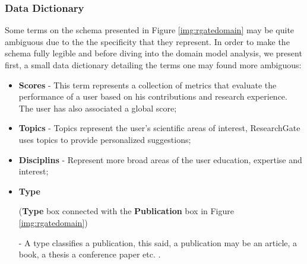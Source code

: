 \subsubsection*{Data Dictionary}
Some terms on the schema presented in Figure \ref{img:rgatedomain} may be quite ambiguous due to the the specificity that they represent. In order to make the schema fully legible and before diving into the domain model analysis, we present first, a small data dictionary detailing the terms one may found more ambiguous:

\begin{itemize}
\item \textbf{Scores} - This term represents a collection of metrics that evaluate the performance of a user based on his contributions and research experience. The user has also associated a global score;
\item \textbf{Topics} - Topics represent the user's scientific areas of interest, ResearchGate uses topics to provide personalized suggestions;
\item \textbf{Disciplins} - Represent more broad areas of the user education,
expertise and interest;
\item \textbf{Type} \begin{small}(\textbf{Type} box connected with the \textbf{Publication} box in Figure \ref{img:rgatedomain})\end{small} - A type classifies a publication, this said, a publication may be an article, a book, a thesis a conference paper etc. .
\end{itemize}

